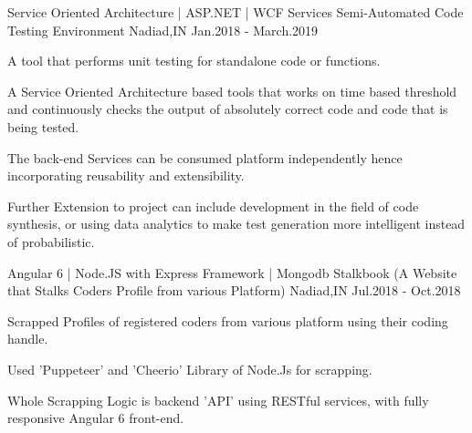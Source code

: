 


\begin{cventries}


\cventry
{Service Oriented Architecture | ASP.NET | WCF Services} %
{Semi-Automated Code Testing Environment} %
{Nadiad,IN} %
{Jan.2018 - March.2019} %
{ %
\begin{cvitems}
\item {A tool that performs unit testing for standalone code or functions.}
\item {A Service Oriented Architecture based tools that works on time based threshold and continuously checks the output of absolutely correct code and code that is being tested.}
\item {The back-end Services can be consumed platform independently hence incorporating reusability and extensibility.}
\item {Further Extension to project can include development in the field of code synthesis, or using data analytics to make test generation more intelligent instead of probabilistic.}
\end{cvitems}
}


\cventry
{Angular 6 | Node.JS with Express Framework | Mongodb} %
{Stalkbook (A Website that Stalks Coders Profile from various Platform)} %
{Nadiad,IN} %
{Jul.2018 - Oct.2018} %
{ %
\begin{cvitems}
\item {Scrapped Profiles of registered coders from various platform using their coding handle.}
\item {Used 'Puppeteer' and 'Cheerio' Library of Node.Js for scrapping.}
\item {Whole Scrapping Logic is backend 'API' using RESTful services, with fully responsive Angular 6 front-end.}
\end{cvitems}
}


\end{cventries}
